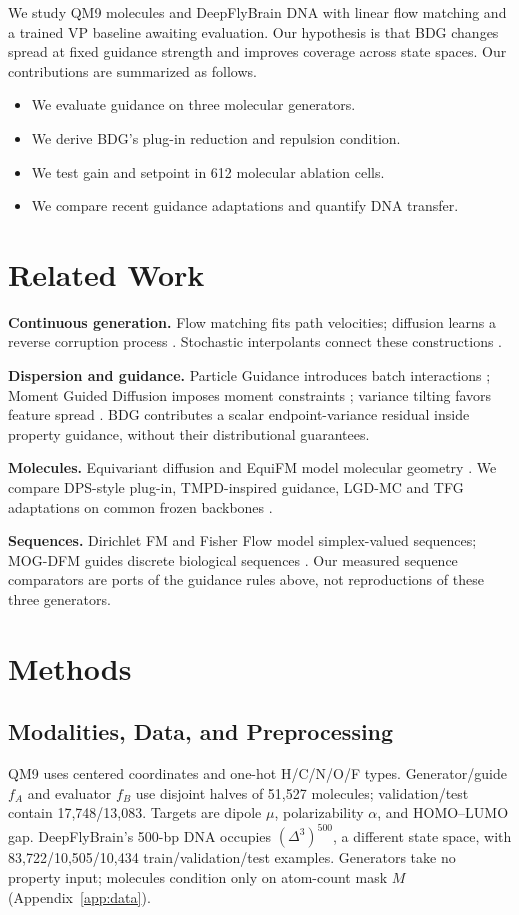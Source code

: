 \documentclass{article}
\begin{document}
We study QM9 molecules and DeepFlyBrain DNA with linear flow matching and a trained VP baseline awaiting evaluation. Our hypothesis is that BDG changes spread at fixed guidance strength and improves coverage across state spaces. Our contributions are summarized as follows.
\begin{itemize}
\item We evaluate guidance on three molecular generators.
\item We derive BDG's plug-in reduction and repulsion condition.
\item We test gain and setpoint in 612 molecular ablation cells.
\item We compare recent guidance adaptations and quantify DNA transfer.
\end{itemize}

\section{Related Work}
\textbf{Continuous generation.} Flow matching fits path velocities; diffusion learns a reverse corruption process \citep{lipman2022flow,karras2022elucidating}. Stochastic interpolants connect these constructions \citep{albergo2025stochastic}.

\textbf{Dispersion and guidance.} Particle Guidance introduces batch interactions \citep{corso2024particle}; Moment Guided Diffusion imposes moment constraints \citep{mgd2026moment}; variance tilting favors feature spread \citep{vtd2026variance}. BDG contributes a scalar endpoint-variance residual inside property guidance, without their distributional guarantees.

\textbf{Molecules.} Equivariant diffusion and EquiFM model molecular geometry \citep{hoogeboom2022equivariant,song2023equifm}. We compare DPS-style plug-in, TMPD-inspired guidance, LGD-MC and TFG adaptations on common frozen backbones \citep{chung2023dps,boys2024tmpd,song2023lgd,ye2024tfg}.

\textbf{Sequences.} Dirichlet FM and Fisher Flow model simplex-valued sequences; MOG-DFM guides discrete biological sequences \citep{stark2024dirichlet,davis2024fisher,chen2025multi}. Our measured sequence comparators are ports of the guidance rules above, not reproductions of these three generators.

\section{Methods}
\subsection{Modalities, Data, and Preprocessing}\label{sec:data}
QM9 \citep{ramakrishnan2014qm9} uses centered coordinates and one-hot H/C/N/O/F types. Generator/guide $f_A$ and evaluator $f_B$ use disjoint halves of 51,527 molecules; validation/test contain 17,748/13,083. Targets are dipole $\mu$, polarizability $\alpha$, and HOMO--LUMO gap. DeepFlyBrain's 500-bp DNA occupies $(\Delta^3)^{500}$, a different state space, with 83,722/10,505/10,434 train/validation/test examples. Generators take no property input; molecules condition only on atom-count mask $M$ (Appendix~\ref{app:data}).
\end{document}
